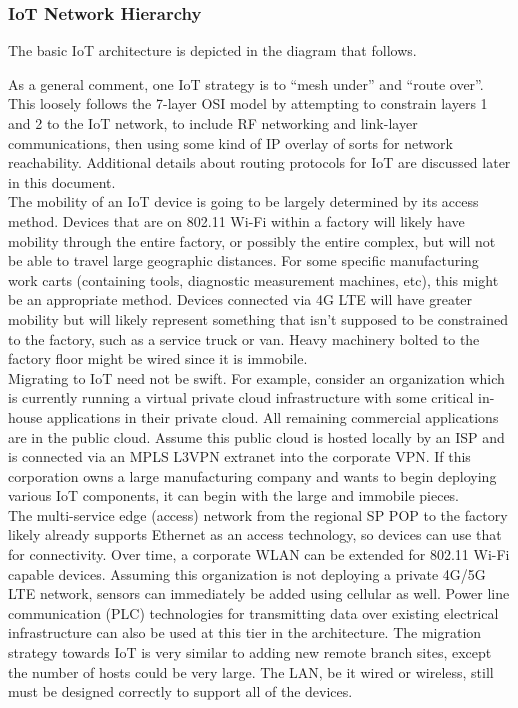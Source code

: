 \subsubsection{IoT Network Hierarchy}
The basic IoT architecture is depicted in the diagram that follows.


As a general comment, one IoT strategy is to ``mesh under'' and ``route
over''. This loosely follows the 7-layer OSI model by attempting to constrain
layers 1 and 2 to the IoT network, to include RF networking and link-layer
communications, then using some kind of IP overlay of sorts for network
reachability. Additional details about routing protocols for IoT are discussed
later in this document. \\

The mobility of an IoT device is going to be largely determined by its access
method. Devices that are on 802.11 Wi-Fi within a factory will likely have
mobility through the entire factory, or possibly the entire complex, but will
not be able to travel large geographic distances. For some specific
manufacturing work carts (containing tools, diagnostic measurement machines,
etc), this might be an appropriate method. Devices connected via 4G LTE will
have greater mobility but will likely represent something that isn’t supposed
to be constrained to the factory, such as a service truck or van. Heavy
machinery bolted to the factory floor might be wired since it is immobile. \\

Migrating to IoT need not be swift. For example, consider an organization
which is currently running a virtual private cloud infrastructure with some
critical in-house applications in their private cloud. All remaining
commercial applications are in the public cloud. Assume this public cloud is
hosted locally by an ISP and is connected via an MPLS L3VPN extranet into the
corporate VPN\@. If this corporation owns a large manufacturing company and
wants to begin deploying various IoT components, it can begin with the large
and immobile pieces. \\

The multi-service edge (access) network from the regional SP POP to the
factory likely already supports Ethernet as an access technology, so devices
can use that for connectivity. Over time, a corporate WLAN can be extended for
802.11 Wi-Fi capable devices. Assuming this organization is not deploying a
private 4G/5G LTE network, sensors can immediately be added using cellular as
well. Power line communication (PLC) technologies for transmitting data over
existing electrical infrastructure can also be used at this tier in the
architecture. The migration strategy towards IoT is very similar to adding new
remote branch sites, except the number of hosts could be very large. The LAN,
be it wired or wireless, still must be designed correctly to support all of
the devices. \\


